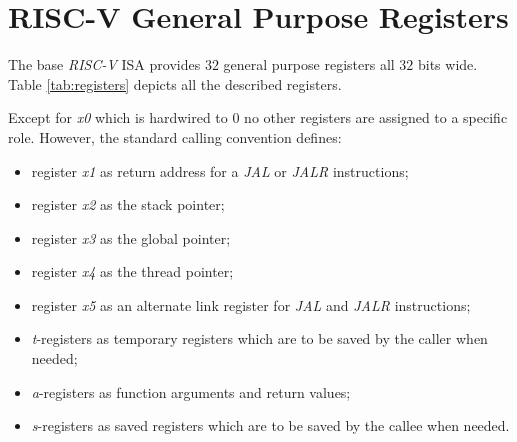 \section{RISC-V General Purpose Registers}
\label{sec:riscv_reg}

The base \textit{RISC-V} ISA provides $32$ general purpose registers all $32$ bits
wide. Table \ref{tab:registers} depicts all the described registers.

Except for \textit{x0} which is hardwired to $0$ no other registers are assigned
to a specific role. However, the standard calling convention defines:
\begin{itemize}[noitemsep]
  \item register \textit{x1} as return address for a \textit{JAL} or \textit{JALR}
    instructions;

  \item register \textit{x2} as the stack pointer;

  \item register \textit{x3} as the global pointer;

  \item register \textit{x4} as the thread pointer;

  \item register \textit{x5} as an alternate link register for \textit{JAL} and \textit{JALR}
    instructions;

  \item \textit{t}-registers as temporary registers which are to be saved by the
    caller when needed;

  \item \textit{a}-registers as function arguments and return values;

  \item \textit{s}-registers as saved registers which are to be saved by the
    callee when needed.
\end{itemize}


